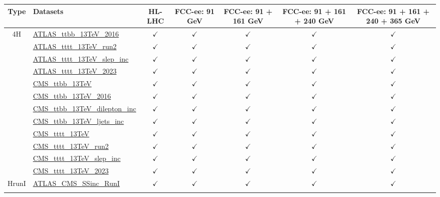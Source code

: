 \documentclass{article}
\begin{document}
\begin{longtable}{|c|l|c|c|c|c|c|}
\hline
\footnotesize
 Type & Datasets  & HL-LHC & FCC-ee: 91 GeV & FCC-ee: 91 + 161 GeV & FCC-ee: 91 + 161 + 240 GeV & FCC-ee: 91 + 161 + 240 + 365 GeV \\ \hline
\multirow{12}{*}{4H}
 & \href{https://arxiv.org}{ATLAS_ttbb_13TeV_2016}  & $\checkmark$ & $\checkmark$ & $\checkmark$ & $\checkmark$ & $\checkmark$\\ \cline{2-7}
 & \href{https://arxiv.org}{ATLAS_tttt_13TeV_run2}  & $\checkmark$ & $\checkmark$ & $\checkmark$ & $\checkmark$ & $\checkmark$\\ \cline{2-7}
 & \href{https://arxiv.org}{ATLAS_tttt_13TeV_slep_inc}  & $\checkmark$ & $\checkmark$ & $\checkmark$ & $\checkmark$ & $\checkmark$\\ \cline{2-7}
 & \href{https://arxiv.org}{ATLAS_tttt_13TeV_2023}  & $\checkmark$ & $\checkmark$ & $\checkmark$ & $\checkmark$ & $\checkmark$\\ \cline{2-7}
 & \href{https://arxiv.org}{CMS_ttbb_13TeV}  & $\checkmark$ & $\checkmark$ & $\checkmark$ & $\checkmark$ & $\checkmark$\\ \cline{2-7}
 & \href{https://arxiv.org}{CMS_ttbb_13TeV_2016}  & $\checkmark$ & $\checkmark$ & $\checkmark$ & $\checkmark$ & $\checkmark$\\ \cline{2-7}
 & \href{https://arxiv.org}{CMS_ttbb_13TeV_dilepton_inc}  & $\checkmark$ & $\checkmark$ & $\checkmark$ & $\checkmark$ & $\checkmark$\\ \cline{2-7}
 & \href{https://arxiv.org}{CMS_ttbb_13TeV_ljets_inc}  & $\checkmark$ & $\checkmark$ & $\checkmark$ & $\checkmark$ & $\checkmark$\\ \cline{2-7}
 & \href{https://arxiv.org}{CMS_tttt_13TeV}  & $\checkmark$ & $\checkmark$ & $\checkmark$ & $\checkmark$ & $\checkmark$\\ \cline{2-7}
 & \href{https://arxiv.org}{CMS_tttt_13TeV_run2}  & $\checkmark$ & $\checkmark$ & $\checkmark$ & $\checkmark$ & $\checkmark$\\ \cline{2-7}
 & \href{https://arxiv.org}{CMS_tttt_13TeV_slep_inc}  & $\checkmark$ & $\checkmark$ & $\checkmark$ & $\checkmark$ & $\checkmark$\\ \cline{2-7}
 & \href{https://arxiv.org}{CMS_tttt_13TeV_2023}  & $\checkmark$ & $\checkmark$ & $\checkmark$ & $\checkmark$ & $\checkmark$
\\ \hline
\multirow{10}{*}{HrunI}
 & \href{https://arxiv.org}{ATLAS_CMS_SSinc_RunI}  & $\checkmark$ & $\checkmark$ & $\checkmark$ & $\checkmark$ & $\checkmark$\\ \cline{2-7}

\end{longtable}
\end{document}
